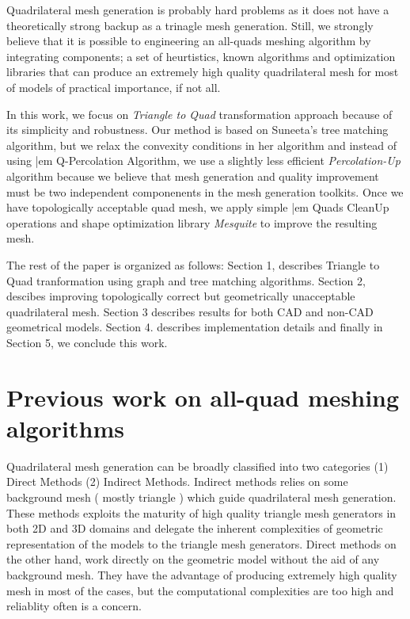 \documentclass[11pt, a4paper]{paper}
\begin{document}
Quadrilateral mesh generation is probably hard problems as it does not have 
a theoretically  strong backup as a trinagle mesh generation. Still,  we strongly 
believe that it is possible to engineering an all-quads meshing algorithm  by 
integrating components; a set of heurtistics, known algorithms and optimization libraries 
that can produce an extremely high quality quadrilateral mesh for most of models of 
practical importance, if not all. 

In this work, we focus on {\em Triangle to Quad} transformation approach because 
of its simplicity and robustness. Our method is based on Suneeta's tree
matching algorithm, but we relax the convexity conditions in her algorithm and
instead of using {|em Q-Percolation Algorithm}, we use a slightly less
efficient {\em Percolation-Up } algorithm because we believe that mesh
generation and quality improvement must be two independent componenents in the
mesh generation toolkits. Once we have topologically acceptable quad mesh,
we apply simple {|em Quads CleanUp } operations and shape optimization library
{\em Mesquite} to improve the resulting mesh.

The rest of the paper is organized as follows: Section 1, describes Triangle to Quad 
tranformation using graph and tree matching algorithms. Section 2, descibes improving 
topologically correct but geometrically unacceptable quadrilateral mesh. Section 3 
describes results for both CAD and non-CAD geometrical models.
Section 4. describes implementation details and finally in Section 5, we conclude this work.


\section {Previous work on all-quad meshing algorithms}

Quadrilateral mesh generation can be broadly classified into two categories
(1) Direct Methods (2) Indirect Methods. Indirect methods relies on some
background mesh ( mostly triangle ) which guide quadrilateral mesh
generation. These methods exploits the maturity of high quality triangle
mesh generators in both 2D and 3D domains and delegate the inherent complexities 
of geometric representation of the models to the triangle mesh generators. 
Direct methods on the other
hand, work directly on the geometric model without the aid of any background
mesh. They have the advantage of producing extremely high quality mesh in most
of the cases, but the computational complexities are too high and reliablity 
often is a concern.
\end{document}
